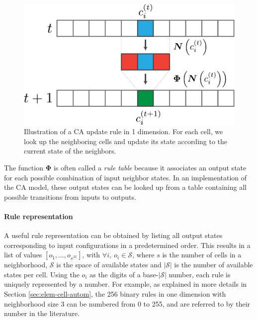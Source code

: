 \begin{figure}[htbp]
  \centering
 \includegraphics[width=.7\linewidth]{figures/ca_base}
  \caption{Illustration of a \acl{CA} update rule in 1 dimension. For each cell,
  we look up the neighboring cells and update its state according to the current
state of the neighbors.}
  \label{fig:ca_base}
\end{figure}

The function $\boldsymbol{\Phi}$ is often called a \emph{rule table} because it
associates an output state for each possible combination of input neighbor
states. In an implementation of the \ac{CA} model, these output states can be
looked up from a table containing all possible transitions from inputs to
outputs.

\paragraph{Rule representation}
A useful rule representation can be obtained by listing all output states
corresponding to input configurations in a predetermined order. This results in
a list of values $[o_1, \ldots, o_{s^{|\mathcal{S}|}}]$, with $\forall i,\ o_{i} \in \mathcal{S}$, where $s$ is
the number of cells in a neighborhood, $\mathcal{S}$ is the space of available states and
$|\mathcal{S}|$ is the number of available states per cell. Using the $o_{i}$ as the
digits of a base-$|\mathcal{S}|$ number, each rule is uniquely represented by a number.
For example, as explained in more details in Section \ref{sec:elem-cell-autom},
the 256 binary rules in one dimension with neighborhood size 3 can be numbered
from 0 to 255, and are referred to by their number in the literature.

